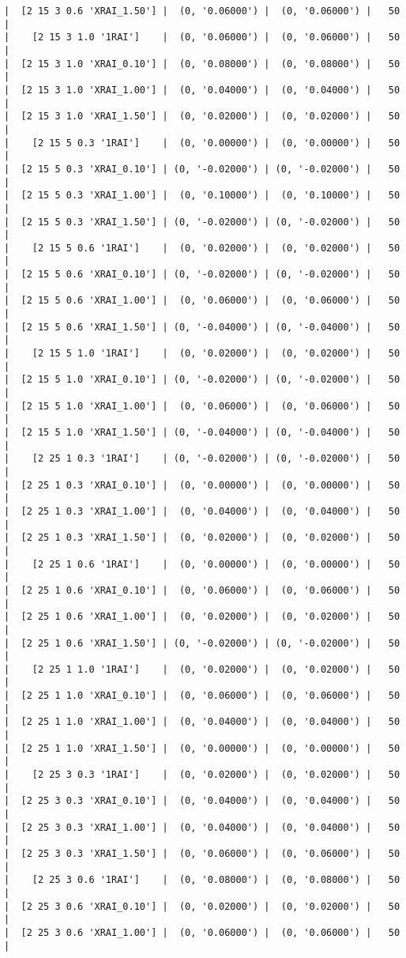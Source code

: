 \documentclass{article}
\begin{document}
\begin{verbatim}
|  [2 15 3 0.6 'XRAI_1.50'] |  (0, '0.06000') |  (0, '0.06000') |   50  |
|    [2 15 3 1.0 '1RAI']    |  (0, '0.06000') |  (0, '0.06000') |   50  |
|  [2 15 3 1.0 'XRAI_0.10'] |  (0, '0.08000') |  (0, '0.08000') |   50  |
|  [2 15 3 1.0 'XRAI_1.00'] |  (0, '0.04000') |  (0, '0.04000') |   50  |
|  [2 15 3 1.0 'XRAI_1.50'] |  (0, '0.02000') |  (0, '0.02000') |   50  |
|    [2 15 5 0.3 '1RAI']    |  (0, '0.00000') |  (0, '0.00000') |   50  |
|  [2 15 5 0.3 'XRAI_0.10'] | (0, '-0.02000') | (0, '-0.02000') |   50  |
|  [2 15 5 0.3 'XRAI_1.00'] |  (0, '0.10000') |  (0, '0.10000') |   50  |
|  [2 15 5 0.3 'XRAI_1.50'] | (0, '-0.02000') | (0, '-0.02000') |   50  |
|    [2 15 5 0.6 '1RAI']    |  (0, '0.02000') |  (0, '0.02000') |   50  |
|  [2 15 5 0.6 'XRAI_0.10'] | (0, '-0.02000') | (0, '-0.02000') |   50  |
|  [2 15 5 0.6 'XRAI_1.00'] |  (0, '0.06000') |  (0, '0.06000') |   50  |
|  [2 15 5 0.6 'XRAI_1.50'] | (0, '-0.04000') | (0, '-0.04000') |   50  |
|    [2 15 5 1.0 '1RAI']    |  (0, '0.02000') |  (0, '0.02000') |   50  |
|  [2 15 5 1.0 'XRAI_0.10'] | (0, '-0.02000') | (0, '-0.02000') |   50  |
|  [2 15 5 1.0 'XRAI_1.00'] |  (0, '0.06000') |  (0, '0.06000') |   50  |
|  [2 15 5 1.0 'XRAI_1.50'] | (0, '-0.04000') | (0, '-0.04000') |   50  |
|    [2 25 1 0.3 '1RAI']    | (0, '-0.02000') | (0, '-0.02000') |   50  |
|  [2 25 1 0.3 'XRAI_0.10'] |  (0, '0.00000') |  (0, '0.00000') |   50  |
|  [2 25 1 0.3 'XRAI_1.00'] |  (0, '0.04000') |  (0, '0.04000') |   50  |
|  [2 25 1 0.3 'XRAI_1.50'] |  (0, '0.02000') |  (0, '0.02000') |   50  |
|    [2 25 1 0.6 '1RAI']    |  (0, '0.00000') |  (0, '0.00000') |   50  |
|  [2 25 1 0.6 'XRAI_0.10'] |  (0, '0.06000') |  (0, '0.06000') |   50  |
|  [2 25 1 0.6 'XRAI_1.00'] |  (0, '0.02000') |  (0, '0.02000') |   50  |
|  [2 25 1 0.6 'XRAI_1.50'] | (0, '-0.02000') | (0, '-0.02000') |   50  |
|    [2 25 1 1.0 '1RAI']    |  (0, '0.02000') |  (0, '0.02000') |   50  |
|  [2 25 1 1.0 'XRAI_0.10'] |  (0, '0.06000') |  (0, '0.06000') |   50  |
|  [2 25 1 1.0 'XRAI_1.00'] |  (0, '0.04000') |  (0, '0.04000') |   50  |
|  [2 25 1 1.0 'XRAI_1.50'] |  (0, '0.00000') |  (0, '0.00000') |   50  |
|    [2 25 3 0.3 '1RAI']    |  (0, '0.02000') |  (0, '0.02000') |   50  |
|  [2 25 3 0.3 'XRAI_0.10'] |  (0, '0.04000') |  (0, '0.04000') |   50  |
|  [2 25 3 0.3 'XRAI_1.00'] |  (0, '0.04000') |  (0, '0.04000') |   50  |
|  [2 25 3 0.3 'XRAI_1.50'] |  (0, '0.06000') |  (0, '0.06000') |   50  |
|    [2 25 3 0.6 '1RAI']    |  (0, '0.08000') |  (0, '0.08000') |   50  |
|  [2 25 3 0.6 'XRAI_0.10'] |  (0, '0.02000') |  (0, '0.02000') |   50  |
|  [2 25 3 0.6 'XRAI_1.00'] |  (0, '0.06000') |  (0, '0.06000') |   50  |

\end{verbatim}
\end{document}
